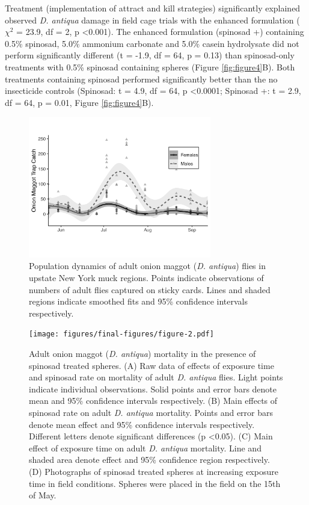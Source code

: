 \documentclass[num-refs]{wiley-article}
\begin{document}
Treatment (implementation of attract and kill strategies) significantly explained observed \textit{D. antiqua} damage in field cage trials with the enhanced formulation ($\chi^2$ = 23.9, df = 2, p \textless 0.001).  The enhanced formulation (spinosad +) containing 0.5\% spinosad, 5.0\% ammonium carbonate and 5.0\% casein hydrolysate did not perform significantly different (t = -1.9, df = 64, p = 0.13) than spinosad-only treatments with 0.5\% spinosad containing spheres (Figure \ref{fig:figure4}B).  Both treatments containing spinosad performed significantly better than the no insecticide controls (Spinosad: t = 4.9, df = 64, p \textless 0.0001; Spinosad +: t = 2.9, df = 64, p = 0.01, Figure \ref{fig:figure4}B).  


\begin{figure}[bt]
\centering
\includegraphics[width = 8cm]{figures/final-figures/figure-1.pdf}
\caption{Population dynamics of adult onion maggot (\textit{D. antiqua}) flies in upstate New York muck regions.  Points indicate observations of numbers of adult flies captured on sticky cards.  Lines and shaded regions indicate smoothed fits and 95\% confidence intervals respectively.  }
\label{fig:figure1}
\end{figure}

\begin{figure}[bt]
\centering
\texttt{[image: figures/final-figures/figure-2.pdf]}
\caption{Adult onion maggot (\textit{D. antiqua}) mortality in the presence of spinosad treated spheres.  (A) Raw data of effects of exposure time and spinosad rate on mortality of adult \textit{D. antiqua} flies.  Light points indicate individual observations.  Solid points and error bars denote mean and 95\% confidence intervals respectively.  (B) Main effects of spinosad rate on adult \textit{D. antiqua} mortality.  Points and error bars denote mean effect and 95\% confidence intervals respectively.  Different letters denote significant differences (p \textless 0.05).  (C) Main effect of exposure time on adult \textit{D. antiqua} mortality.  Line and shaded area denote effect and 95\% confidence region respectively.  (D) Photographs of spinosad treated spheres at increasing exposure time in field conditions.  Spheres were placed in the field on the 15th of May.  }
\label{fig:figure2}
\end{figure}
\end{document}
